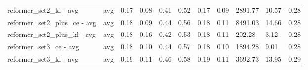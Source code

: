 \begin{longtable}{|p{1.3cm}|p{1.3cm}|p{1.3cm}|p{1.3cm}|p{1.3cm}|p{1.3cm}|p{1.3cm}|p{1.3cm}|p{1.3cm}|p{1.3cm}|p{1.3cm}|}
reformer_set2_kl - avg & avg & 0.17 & 0.08 & 0.41 & 0.52 & 0.17 & 0.09 & 2891.77 & 10.57 & 0.28 \\
reformer_set2_plus_ce - avg & avg & 0.18 & 0.09 & 0.44 & 0.56 & 0.18 & 0.11 & 8491.03 & 14.66 & 0.28 \\
reformer_set2_plus_kl - avg & avg & 0.18 & 0.16 & 0.42 & 0.53 & 0.18 & 0.11 & 202.28 & 3.12 & 0.28 \\
reformer_set3_ce - avg & avg & 0.18 & 0.10 & 0.44 & 0.57 & 0.18 & 0.10 & 1894.28 & 9.01 & 0.28 \\
reformer_set3_kl - avg & avg & 0.19 & 0.11 & 0.46 & 0.58 & 0.19 & 0.11 & 3692.73 & 13.95 & 0.29 \\
\hline
\end{longtable}